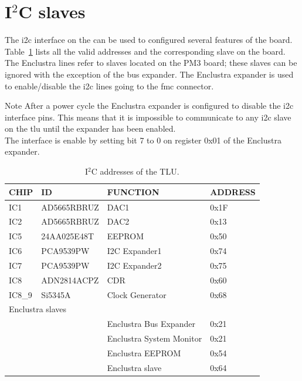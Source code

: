 \section{I$^{2}$C slaves}\label{ch:i2c}
The \gls{i2c} interface on the \brd can be used to configured several features of the board.\\
Table~\ref{tab:I2C addresses} lists all the valid addresses and the corresponding slave on the board. The Enclustra lines refer to slaves located on the PM3 board; these slaves can be ignored with the exception of the bus expander. The Enclustra expander is used to enable/disable the \gls{i2c} lines going to the \gls{fmc} connector.
\begin{alertinfo}{Note}
    After a power cycle the Enclustra expander is configured to disable the \gls{i2c} interface pins. This means that it is impossible to communicate to any \gls{i2c} slave on the \gls{tlu} until the expander has been enabled.\\
    The interface is enable by setting bit 7 to 0 on register 0x01 of the Enclustra expander.
\end{alertinfo}
\begin{table}[]
    \centering
    \caption{I$^{2}$C addresses of the TLU. }
    \label{tab:I2C addresses}
    \begin{tabular}{|l|l|l|l|}
    \hline
    \textbf{CHIP} & \textbf{ID} & \textbf{FUNCTION}        & \textbf{ADDRESS} \\ \hline
    IC1           & AD5665RBRUZ & DAC1                     & 0x1F             \\ \hline
    IC2           & AD5665RBRUZ & DAC2                     & 0x13             \\ \hline
    IC5           & 24AA025E48T & EEPROM                   & 0x50             \\ \hline
    IC6           & PCA9539PW   & I2C Expander1            & 0x74             \\ \hline
    IC7           & PCA9539PW   & I2C Expander2            & 0x75             \\ \hline
    IC8           & ADN2814ACPZ & CDR                      & 0x60             \\ \hline
    IC8\_9        & Si5345A     & Clock Generator          & 0x68             \\ \hline
    \multicolumn{4}{|l|}{Enclustra slaves}                                                    \\ \hline
                  &             & Enclustra Bus Expander   & 0x21             \\ \hline
                  &             & Enclustra System Monitor & 0x21             \\ \hline
                  &             & Enclustra EEPROM         & 0x54             \\ \hline
                  &             & Enclustra slave          & 0x64             \\ \hline
\end{tabular}
\end{table}
